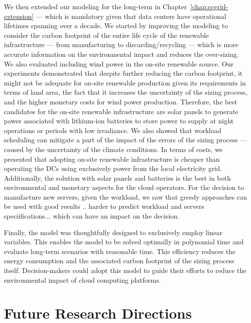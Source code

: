 We then extended our modeling for the long-term in Chapter~\ref{chap:ccgrid-extension} --- which is mandatory given that data centers have operational lifetimes spanning over a decade. We started by improving the modeling to consider the carbon footprint of the entire life cycle of the renewable infrastructure --- from manufacturing to discarding/recycling --- which is more accurate information on the environmental impact and reduces the over-sizing. We also evaluated including wind power in the on-site renewable source. Our experiments demonstrated that despite further reducing the carbon footprint, it might not be adequate for on-site renewable production given its requirements in terms of land area, the fact that it increases the uncertainty of the sizing process, and the higher monetary costs for wind power production. Therefore, the best candidates for the on-site renewable infrastructure are solar panels to generate power associated with lithium-ion batteries to store power to supply at night operations or periods with low irradiance. We also showed that workload scheduling can mitigate a part of the impact of the errors of the sizing process --- caused by the uncertainty of the climate conditions. In terms of costs, we presented that adopting on-site renewable infrastructure is cheaper than operating the DCs using exclusively power from the local electricity grid. Additionally, the solution with solar panels and batteries is the best in both environmental and monetary aspects for the cloud operators. For the decision to manufacture new servers, given the workload, we saw that greedy approaches can be used with good results .. harder to predict workload and servers speciifications... which can have an impact on the decision.


Finally, the model was thoughtfully designed to exclusively employ linear variables. This enables the model to be solved optimally in polynomial time and evaluate long-term scenarios with reasonable time. This efficiency reduces the energy consumption and the associated carbon footprint of the sizing process itself. Decision-makers could adopt this model to guide their efforts to reduce the environmental impact of cloud computing platforms.



\section{Future Research Directions}

